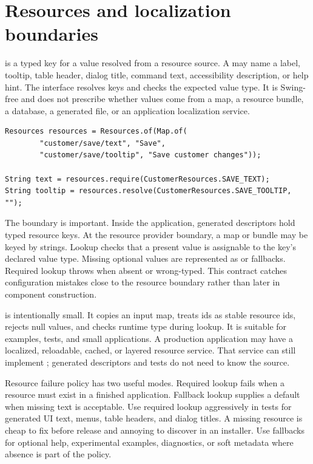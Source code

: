 \section{Resources and localization boundaries}

 is a typed key for a value resolved from a
resource source. A  may name a label, tooltip, table
header, dialog title, command text, accessibility description, or help hint.
The  interface resolves keys and checks the expected value type.
It is Swing-free and does not prescribe whether values come from a map, a
resource bundle, a database, a generated file, or an application localization
service.

\begin{lstlisting}[caption={Typed resource lookup.}]
Resources resources = Resources.of(Map.of(
        "customer/save/text", "Save",
        "customer/save/tooltip", "Save customer changes"));

String text = resources.require(CustomerResources.SAVE_TEXT);
String tooltip = resources.resolve(CustomerResources.SAVE_TOOLTIP, "");
\end{lstlisting}

The boundary is important. Inside the application, generated descriptors hold
typed resource keys. At the resource provider boundary, a map or bundle may be
keyed by strings. Lookup checks that a present value is assignable to the
key's declared value type. Missing optional values are represented as
 or fallbacks. Required lookup throws 
when absent or wrong-typed. This contract catches configuration mistakes close
to the resource boundary rather than later in component construction.

 is intentionally small. It copies an input map, treats ids
as stable resource ids, rejects null values, and checks runtime type during
lookup. It is suitable for examples, tests, and small applications. A
production application may have a localized, reloadable, cached, or layered
resource service. That service can still implement ; generated
descriptors and tests do not need to know the source.

Resource failure policy has two useful modes. Required lookup fails when a
resource must exist in a finished application. Fallback lookup supplies a
default when missing text is acceptable. Use required lookup aggressively in
tests for generated UI text, menus, table headers, and dialog titles. A missing
resource is cheap to fix before release and annoying to discover in an
installer. Use fallbacks for optional help, experimental examples, diagnostics,
or soft metadata where absence is part of the policy.

